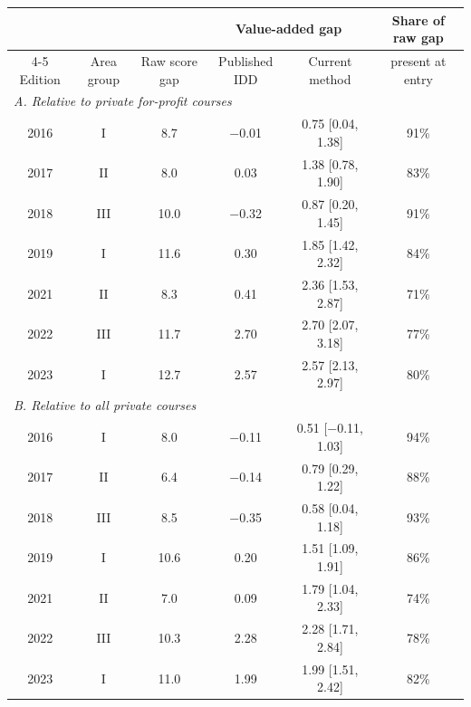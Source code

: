\begin{tabular}{cccccc}
\toprule
 & & & \multicolumn{2}{c}{Value-added gap} & Share of raw gap \\
\cmidrule(lr){4-5}
Edition & Area group & Raw score gap & Published IDD & Current method & present at entry \\
\midrule
\multicolumn{6}{l}{\textit{A. Relative to private for-profit courses}} \\
2016 & I & 8.7 & $-$0.01 & 0.75 [0.04, 1.38] & 91\% \\
2017 & II & 8.0 & 0.03 & 1.38 [0.78, 1.90] & 83\% \\
2018 & III & 10.0 & $-$0.32 & 0.87 [0.20, 1.45] & 91\% \\
2019 & I & 11.6 & 0.30 & 1.85 [1.42, 2.32] & 84\% \\
2021 & II & 8.3 & 0.41 & 2.36 [1.53, 2.87] & 71\% \\
2022 & III & 11.7 & 2.70 & 2.70 [2.07, 3.18] & 77\% \\
2023 & I & 12.7 & 2.57 & 2.57 [2.13, 2.97] & 80\% \\
\midrule
\multicolumn{6}{l}{\textit{B. Relative to all private courses}} \\
2016 & I & 8.0 & $-$0.11 & 0.51 [$-$0.11, 1.03] & 94\% \\
2017 & II & 6.4 & $-$0.14 & 0.79 [0.29, 1.22] & 88\% \\
2018 & III & 8.5 & $-$0.35 & 0.58 [0.04, 1.18] & 93\% \\
2019 & I & 10.6 & 0.20 & 1.51 [1.09, 1.91] & 86\% \\
2021 & II & 7.0 & 0.09 & 1.79 [1.04, 2.33] & 74\% \\
2022 & III & 10.3 & 2.28 & 2.28 [1.71, 2.84] & 78\% \\
2023 & I & 11.0 & 1.99 & 1.99 [1.51, 2.42] & 82\% \\
\bottomrule
\end{tabular}